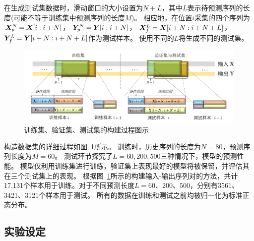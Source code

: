 在生成测试集数据时，滑动窗口的大小设置为$N+L$，其中$L$表示待预测序列的长度(可能不等于训练集中预测序列的长度$M$)。
相应地，在位置$i$采集的四个序列为$\boldsymbol X _p^N =\boldsymbol X[i:i+N]$， $\boldsymbol Y _p^N =\boldsymbol Y[i:i+N]$， $\boldsymbol X _f^L=\boldsymbol X[i+N:i+N+L]$， $\boldsymbol Y _f^L=\boldsymbol Y[i+N:i+N+L]$作为测试样本。
使用不同的$L$将生成不同的测试集。

\begin{figure}[t]
    \centering
    \includegraphics[width=\linewidth]{figures/chapter3/dataset.pdf}
    \caption{
    训练集、验证集、测试集的构建过程图示
    }
    \label{fig:dataset}
\end{figure}


构造数据集的详细过程如图~\ref{fig:dataset}所示。
训练时，历史序列的长度为$N=80$，预测序列长度为$M=60$。
测试环节探究了$L=60, 200, 500$三种情况下，模型的预测性能。
模型仅利用训练集进行训练，验证集上表现最好的模型将被保留，并评估其在三个测试集上的表现。
根据图~\ref{fig:dataset}所示的构建输入-输出序列对的方法，共计17,131个样本用于训练。对于不同预测长度$L=60、200、500$，分别有3561、3421、3121个样本用于测试。
所有的数据在训练和测试之前均被归一化为标准正态分布。

\subsection{实验设定}

